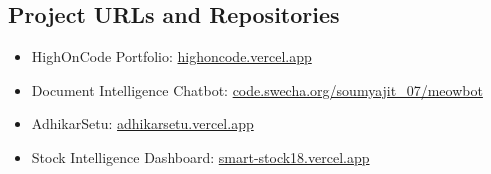 \documentclass{book}
\begin{document}


\begin{appendices}
\chapter{Project URLs and Repositories}
\begin{itemize}
  \item HighOnCode Portfolio: \href{https://highoncode.vercel.app}{highoncode.vercel.app}
  \item Document Intelligence Chatbot: \href{https://code.swecha.org/soumyajit_07/meowbot}{code.swecha.org/soumyajit\_07/meowbot}
  \item AdhikarSetu: \href{https://adhikarsetu.vercel.app}{adhikarsetu.vercel.app}
  \item Stock Intelligence Dashboard: \href{https://smart-stock18.vercel.app}{smart-stock18.vercel.app}
\end{itemize}
\end{appendices}
\end{document}
